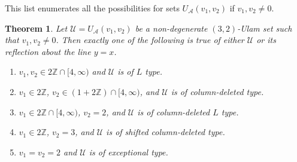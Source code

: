 \documentclass{amsart}
\newcommand{\ZZ}{\mathbb{Z}}
\newcommand{\U}{\mathcal{U}}
\newcommand{\A}{\mathcal{A}}
\theoremstyle{theorem}
\newtheorem{theorem}{Theorem}[section]
\theoremstyle{definition}
\begin{document}
This list enumerates all the possibilities for sets $U_\A(v_1, v_2)$ if $v_1, v_2 \neq 0$.

\begin{theorem}\label{Type Theorem}
Let $\U = U_\A(v_1, v_2)$ be a non-degenerate $(3,2)$-Ulam set such that $v_1, v_2 \neq 0$. Then exactly one of the following is true of either $\U$ or its reflection about the line $y = x$.
\begin{enumerate}
	\item $v_1, v_2 \in 2\ZZ \cap [4,\infty)$ and $\U$ is of $L$ type.
    \item $v_1 \in 2\ZZ$, $v_2 \in \left(1 + 2\ZZ\right) \cap [4,\infty)$, and $\U$ is of column-deleted type.
    \item $v_1 \in 2\ZZ \cap [4,\infty)$, $v_2 = 2$, and $\U$ is of column-deleted $L$ type.
    \item $v_1 \in 2\ZZ$, $v_2 = 3$, and $\U$ is of shifted column-deleted type.
    \item $v_1 = v_2 = 2$ and $\U$ is of exceptional type.
\end{enumerate}
\end{theorem}
\end{document}
